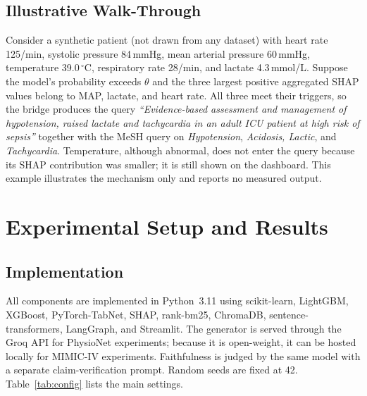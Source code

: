 \documentclass[conference]{IEEEtran}
\newcommand{\tbd}{\textcolor{red}{\textbf{TBD}}}
\begin{document}
\subsection{Illustrative Walk-Through}
Consider a synthetic patient (not drawn from any dataset) with heart rate
125/min, systolic pressure 84\,mmHg, mean arterial pressure 60\,mmHg,
temperature 39.0\,$^\circ$C, respiratory rate 28/min, and lactate
4.3\,mmol/L. Suppose the model's probability exceeds $\theta$ and the three
largest positive aggregated SHAP values belong to MAP, lactate, and heart
rate. All three meet their triggers, so the bridge produces the query
\emph{``Evidence-based assessment and management of hypotension, raised
lactate and tachycardia in an adult ICU patient at high risk of
sepsis''} together with the MeSH query on \emph{Hypotension},
\emph{Acidosis, Lactic}, and \emph{Tachycardia}. Temperature, although
abnormal, does not enter the query because its SHAP contribution was
smaller; it is still shown on the dashboard. This example illustrates the
mechanism only and reports no measured output.

\section{Experimental Setup and Results}


\subsection{Implementation}
All components are implemented in Python~3.11 using scikit-learn,
LightGBM, XGBoost, PyTorch-TabNet, SHAP, rank-bm25, ChromaDB,
sentence-transformers, LangGraph, and Streamlit. The generator is served
through the Groq API for PhysioNet experiments; because it is open-weight,
it can be hosted locally for MIMIC-IV experiments. Faithfulness is judged
by the same model with a separate claim-verification prompt. Random seeds are fixed at 42. Table~\ref{tab:config}
lists the main settings.
\end{document}
